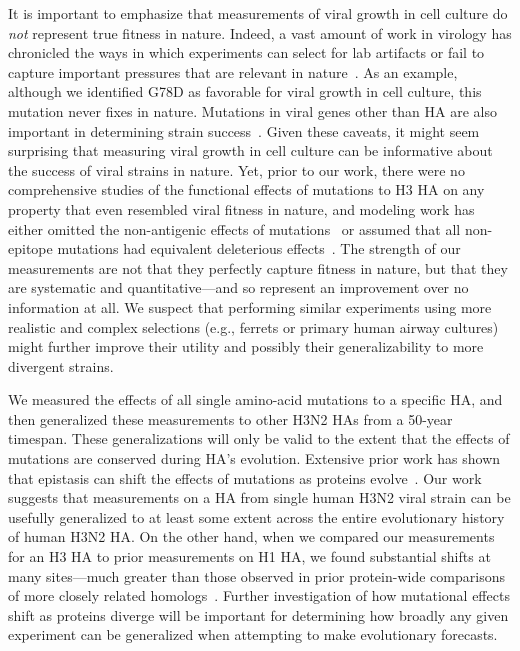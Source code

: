 It is important to emphasize that measurements of viral growth in cell culture do \emph{not} represent true fitness in nature.
Indeed, a vast amount of work in virology has chronicled the ways in which experiments can select for lab artifacts or fail to capture important pressures that are relevant in nature~\citep{daniels1985fusion,sun2010modifications,lee2013comparison,wu2017structural}.
As an example, although we identified G78D as favorable for viral growth in cell culture, this mutation never fixes in nature.
Mutations in viral genes other than HA are also important in determining strain success~\citep{memoli2009recent,raghwani2017selection}.
Given these caveats, it might seem surprising that measuring viral growth in cell culture can be informative about the success of viral strains in nature.
Yet, prior to our work, there were no comprehensive studies of the functional effects of mutations to H3 HA on any property that even resembled viral fitness in nature, and modeling work has either omitted the non-antigenic effects of mutations~\citep{sun2013using,harvey2016identification,Neher:2016hy} or assumed that all non-epitope mutations had equivalent deleterious effects~\citep{Luksza:2014hj}.
The strength of our measurements are not that they perfectly capture fitness in nature, but that they are systematic and quantitative---and so represent an improvement over no information at all.
We suspect that performing similar experiments using more realistic and complex selections (e.g., ferrets or primary human airway cultures) might further improve their utility and possibly their generalizability to more divergent strains.

We measured the effects of all single amino-acid mutations to a specific HA, and then generalized these measurements to other H3N2 HAs from a 50-year timespan.
These generalizations will only be valid to the extent that the effects of mutations are conserved during HA's evolution.
Extensive prior work has shown that epistasis can shift the effects of mutations as proteins evolve~\citep{pollock2012amino,shah2015contingency,gong2013stability,natarajan2013epistasis,harms2014historical,starr2016epistasis,starr2017alternative}.
Our work suggests that measurements on a HA from single human H3N2 viral strain can be usefully generalized to at least some extent across the entire evolutionary history of human H3N2 HA.
On the other hand, when we compared our measurements for an H3 HA to prior measurements on H1 HA, we found substantial shifts at many sites---much greater than those observed in prior protein-wide comparisons of more closely related homologs~\citep{doud2015site,haddox2018mapping}.
Further investigation of how mutational effects shift as proteins diverge will be important for determining how broadly any given experiment can be generalized when attempting to make evolutionary forecasts.


